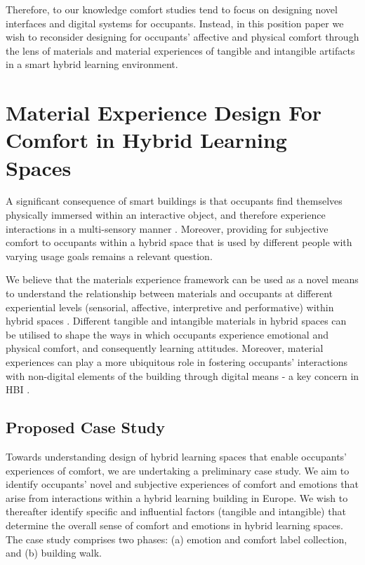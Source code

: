 \documentclass[manuscript, anonymous, review]{acmart}
\begin{document}
Therefore, to our knowledge comfort studies tend to focus on designing novel interfaces and digital systems for occupants. Instead, in this position paper we wish to reconsider designing for occupants' affective and physical comfort through the lens of materials and material experiences of tangible and intangible artifacts in a smart hybrid learning environment. 


\section{Material Experience Design For Comfort in Hybrid Learning Spaces}

A significant consequence of smart buildings is that occupants find themselves physically immersed within an interactive object, and therefore experience interactions in a multi-sensory manner \cite{nembrini2017human}. Moreover, providing for subjective comfort to occupants within a hybrid space that is used by different people with varying usage goals remains a relevant question. 

We believe that the materials experience framework can be used as a novel means to understand the relationship between materials and occupants at different experiential levels (sensorial, affective, interpretive and performative) within hybrid spaces \cite{giaccardi2015foundations}. Different tangible and intangible materials in hybrid spaces can be utilised to shape the ways in which occupants experience emotional and physical comfort, and consequently learning attitudes. Moreover, material
experiences can play a more ubiquitous role in fostering occupants' interactions with non-digital elements of the building through digital means - a key concern in HBI \cite{nembrini2017human}. 

\subsection{Proposed Case Study} 
Towards understanding design of hybrid learning spaces that enable occupants' experiences of comfort, we are undertaking a preliminary case study. We aim to identify occupants' novel and subjective experiences of comfort and emotions that arise from interactions within a hybrid learning building in Europe. We wish to thereafter identify specific and influential factors (tangible and intangible) that determine the overall sense of comfort and emotions in hybrid learning spaces. The case study comprises two phases: (a) emotion and comfort label collection, and (b) building walk.
\end{document}

